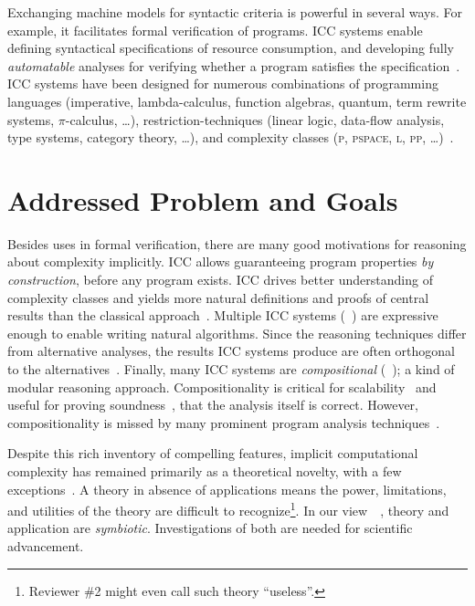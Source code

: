 Exchanging machine models for syntactic criteria is powerful in several ways.
For example, it facilitates formal verification of programs.
ICC systems enable defining syntactical specifications of resource consumption, and developing fully \emph{automatable} analyses for verifying whether a program satisfies the specification~\cite{heraud2011}.
ICC systems have been designed for numerous combinations of programming languages (imperative,  lambda-calculus, function algebras, quantum, term rewrite systems, \(\pi\)-calculus, \ldots), restriction-techniques (linear logic, data-flow analysis, type systems, category theory, \ldots), and complexity classes (\textsc{p}, \textsc{pspace}, \textsc{l}, \textsc{pp}, \ldots)~\cite{baillot2012,moyen2017,pchoux2020}.

\section{Addressed Problem and Goals}
\label{sec:aicc-goals}

Besides uses in formal verification, there are many good motivations for reasoning about complexity implicitly.
ICC allows guaranteeing program properties \emph{by construction}, before any program exists.
ICC drives better understanding of complexity classes and yields more natural definitions and proofs of central results than the classical approach~\cite{kristiansen2017}.
Multiple ICC systems (\eg~\cite{jones2009,marion2011}) are expressive enough to enable writing {natural} algorithms.
Since the reasoning techniques differ from alternative analyses, the results ICC systems produce are often orthogonal to the alternatives~\cite{aubert20222}.
Finally, many ICC systems are \emph{compositional} (\eg~\cite{jones2009,marion2011,hainry2023,atkey2024}); a kind of modular reasoning approach.
Compositionality is critical for scalability~\cite{carbonneaux2015} and useful for proving soundness~\cite{keidel2021}, \ie that the analysis itself is correct.
However, compositionality is missed by many prominent program analysis techniques~\cite{carbonneaux2015,schiebel2024}.

Despite this rich inventory of compelling features, implicit computational complexity has remained primarily as a theoretical novelty, with a few exceptions~\cite{avanzini2017,avanzini2008,moyen20172,hoffmann2012,hainry2021,feree2018}.
A theory in absence of applications means the power, limitations, and utilities of the theory are difficult to recognize\footnote{
Reviewer \#2 might even call such theory \enquote{useless}.}.
In our view~\cite[pg. xxxv]{bishop2003}~\cite[p. 75]{moyen2017}, theory and application are \emph{symbiotic}.
Investigations of both are needed for scientific advancement.

